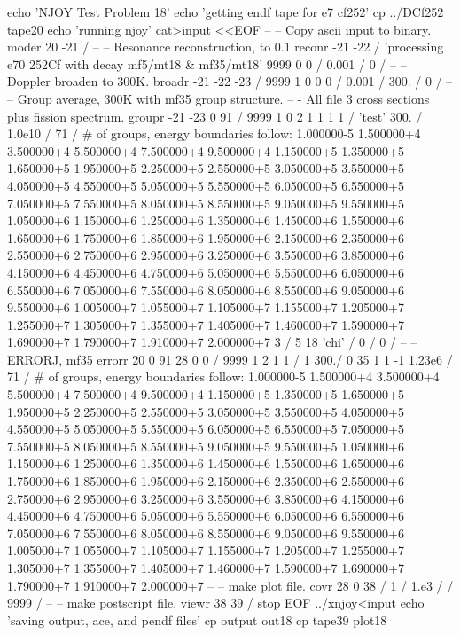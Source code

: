 \small
\begin{ccode}

echo 'NJOY Test Problem 18'
echo 'getting endf tape for e7 cf252'
cp ../DCf252 tape20
echo 'running njoy'
cat>input <<EOF
--
-- Copy ascii input to binary.
moder
 20 -21 /
--
-- Resonance reconstruction, to 0.1%
reconr
 -21 -22 /
 'processing e70 252Cf with decay mf5/mt18 & mf35/mt18'
 9999 0 0 /
 0.001 /
 0 /
--
-- Doppler broaden to 300K.
broadr
 -21 -22 -23 /
 9999 1 0 0 0 /
 0.001 /
 300. /
 0 /
--
-- Group average, 300K with mf35 group structure.
--  - All file 3 cross sections plus fission spectrum.
groupr
 -21 -23 0 91 /
 9999 1 0 2 1 1 1 1 /
 'test'
 300. /
 1.0e10 /
 71 / # of groups, energy boundaries follow:
 1.000000-5 1.500000+4 3.500000+4 5.500000+4 7.500000+4
 9.500000+4 1.150000+5 1.350000+5 1.650000+5 1.950000+5
 2.250000+5 2.550000+5 3.050000+5 3.550000+5 4.050000+5
 4.550000+5 5.050000+5 5.550000+5 6.050000+5 6.550000+5
 7.050000+5 7.550000+5 8.050000+5 8.550000+5 9.050000+5
 9.550000+5 1.050000+6 1.150000+6 1.250000+6 1.350000+6
 1.450000+6 1.550000+6 1.650000+6 1.750000+6 1.850000+6
 1.950000+6 2.150000+6 2.350000+6 2.550000+6 2.750000+6
 2.950000+6 3.250000+6 3.550000+6 3.850000+6 4.150000+6
 4.450000+6 4.750000+6 5.050000+6 5.550000+6 6.050000+6
 6.550000+6 7.050000+6 7.550000+6 8.050000+6 8.550000+6
 9.050000+6 9.550000+6 1.005000+7 1.055000+7 1.105000+7
 1.155000+7 1.205000+7 1.255000+7 1.305000+7 1.355000+7
 1.405000+7 1.460000+7 1.590000+7 1.690000+7 1.790000+7
 1.910000+7 2.000000+7
 3 /
 5 18  'chi' /
 0 /
 0 /
--
-- ERRORJ, mf35
errorr
 20 0 91 28 0 0 /
 9999 1 2 1 1 /
 1 300./
 0 35 1 1 -1 1.23e6 /
 71 / # of groups, energy boundaries follow:
 1.000000-5 1.500000+4 3.500000+4 5.500000+4 7.500000+4
 9.500000+4 1.150000+5 1.350000+5 1.650000+5 1.950000+5
 2.250000+5 2.550000+5 3.050000+5 3.550000+5 4.050000+5
 4.550000+5 5.050000+5 5.550000+5 6.050000+5 6.550000+5
 7.050000+5 7.550000+5 8.050000+5 8.550000+5 9.050000+5
 9.550000+5 1.050000+6 1.150000+6 1.250000+6 1.350000+6
 1.450000+6 1.550000+6 1.650000+6 1.750000+6 1.850000+6
 1.950000+6 2.150000+6 2.350000+6 2.550000+6 2.750000+6
 2.950000+6 3.250000+6 3.550000+6 3.850000+6 4.150000+6
 4.450000+6 4.750000+6 5.050000+6 5.550000+6 6.050000+6
 6.550000+6 7.050000+6 7.550000+6 8.050000+6 8.550000+6
 9.050000+6 9.550000+6 1.005000+7 1.055000+7 1.105000+7
 1.155000+7 1.205000+7 1.255000+7 1.305000+7 1.355000+7
 1.405000+7 1.460000+7 1.590000+7 1.690000+7 1.790000+7
 1.910000+7 2.000000+7
--
-- make plot file.
covr
 28 0 38 /
 1 /
 1.e3 /
 /
 9999 /
--
-- make postscript file.
viewr
 38 39 /
stop
EOF
../xnjoy<input
echo 'saving output, ace, and pendf files'
cp output out18
cp tape39 plot18

\end{ccode}
\normalsize

